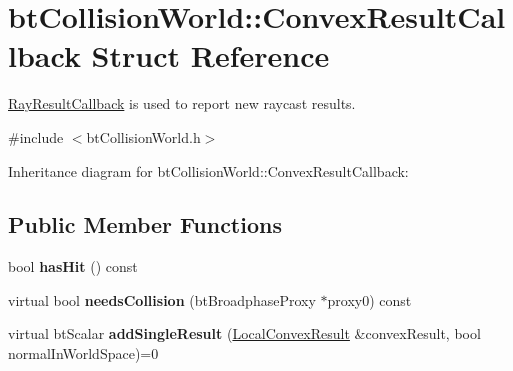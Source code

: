 \hypertarget{structbt_collision_world_1_1_convex_result_callback}{\section{bt\+Collision\+World\+:\+:Convex\+Result\+Callback Struct Reference}
\label{structbt_collision_world_1_1_convex_result_callback}
}


\hyperlink{structbt_collision_world_1_1_ray_result_callback}{Ray\+Result\+Callback} is used to report new raycast results.  




{\ttfamily \#include $<$bt\+Collision\+World.\+h$>$}



Inheritance diagram for bt\+Collision\+World\+:\+:Convex\+Result\+Callback\+:
\subsection*{Public Member Functions}
\begin{DoxyCompactItemize}
\item 
\hypertarget{structbt_collision_world_1_1_convex_result_callback_a31d4cf0080464c29f3cd1aa5b0474f13}{bool {\bfseries has\+Hit} () const }\label{structbt_collision_world_1_1_convex_result_callback_a31d4cf0080464c29f3cd1aa5b0474f13}

\item 
\hypertarget{structbt_collision_world_1_1_convex_result_callback_a59ac8d9fbe0b4d416c7c1c950e9298a1}{virtual bool {\bfseries needs\+Collision} (bt\+Broadphase\+Proxy $\ast$proxy0) const }\label{structbt_collision_world_1_1_convex_result_callback_a59ac8d9fbe0b4d416c7c1c950e9298a1}

\item 
\hypertarget{structbt_collision_world_1_1_convex_result_callback_ad556dcf14b042151a6dc0cc154597a9a}{virtual bt\+Scalar {\bfseries add\+Single\+Result} (\hyperlink{structbt_collision_world_1_1_local_convex_result}{Local\+Convex\+Result} \&convex\+Result, bool normal\+In\+World\+Space)=0}\label{structbt_collision_world_1_1_convex_result_callback_ad556dcf14b042151a6dc0cc154597a9a}

\end{DoxyCompactItemize}
